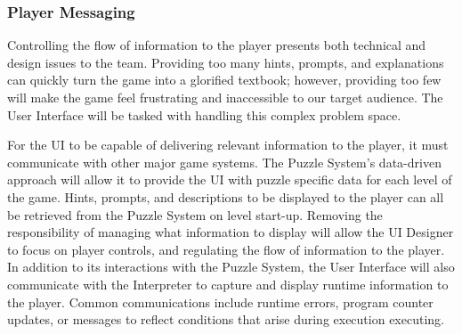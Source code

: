 \subsubsection{Player Messaging}
Controlling the flow of information to the player presents both technical and design 
issues to the team. Providing too many hints, prompts, and explanations can quickly 
turn the game into a glorified textbook; however, providing too few will make the game 
feel frustrating and inaccessible to our target audience. The User Interface will be tasked 
with handling this complex problem space.   

For the UI to be capable of delivering relevant information to the player, it must communicate 
with other major game systems. The Puzzle System's data-driven approach will allow it to 
provide the UI with puzzle specific data for each level of the game. Hints, prompts, and 
descriptions to be displayed to the player can all be retrieved from the Puzzle System on 
level start-up. Removing the responsibility of managing what information to display will 
allow the UI Designer to focus on player controls, and regulating the flow of information 
to the player.\\

In addition to its interactions with the Puzzle System, the User Interface will also communicate 
with the Interpreter to capture and display runtime information to the player. Common 
communications include runtime errors, program counter updates, or messages to reflect 
conditions that arise during execution executing.\\